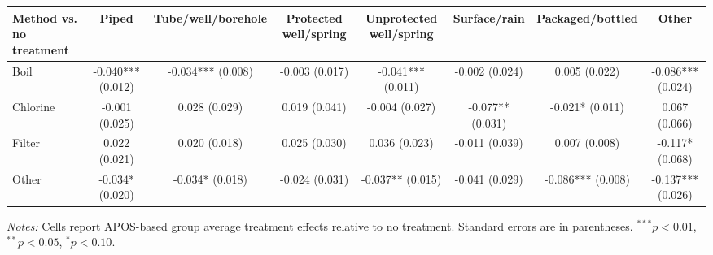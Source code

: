\begin{table}[p]
\begin{adjustbox}{max width=\linewidth, center}
\begin{tabular}{lccccccc}
Method vs. no treatment & Piped & Tube/well/borehole & Protected well/spring & Unprotected well/spring & Surface/rain & Packaged/bottled & Other \\
\midrule
Boil & -0.040*** (0.012) & -0.034*** (0.008) & -0.003 (0.017) & -0.041*** (0.011) & -0.002 (0.024) & 0.005 (0.022) & -0.086*** (0.024) \\
Chlorine & -0.001 (0.025) & 0.028 (0.029) & 0.019 (0.041) & -0.004 (0.027) & -0.077** (0.031) & -0.021* (0.011) & 0.067 (0.066) \\
Filter & 0.022 (0.021) & 0.020 (0.018) & 0.025 (0.030) & 0.036 (0.023) & -0.011 (0.039) & 0.007 (0.008) & -0.117* (0.068) \\
Other & -0.034* (0.020) & -0.034* (0.018) & -0.024 (0.031) & -0.037** (0.015) & -0.041 (0.029) & -0.086*** (0.008) & -0.137*** (0.026) \\
\bottomrule
\end{tabular}
\end{adjustbox}
\par\vspace{3pt}
\begin{minipage}{\linewidth}\footnotesize \textit{Notes:} Cells report APOS-based group average treatment effects relative to no treatment. Standard errors are in parentheses. $^{***}p<0.01$, $^{**}p<0.05$, $^{*}p<0.10$.\end{minipage}
\end{table}
